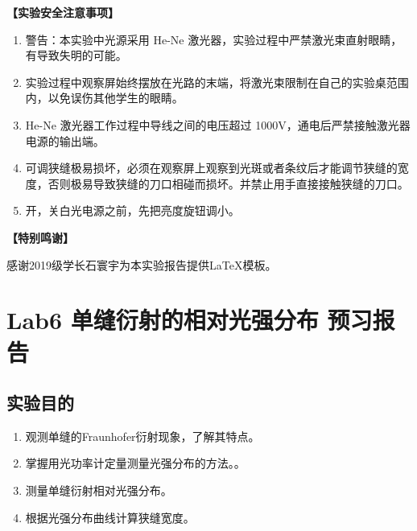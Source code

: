 \documentclass[dvipsnames, svgnames,a4paper,11pt]{article}
\begin{document}
	\textbf{【实验安全注意事项】}	
	\begin{enumerate}
		\item 警告：本实验中光源采用 He-Ne 激光器，实验过程中严禁激光束直射眼睛，有导致失明的可能。
		\item 实验过程中观察屏始终摆放在光路的末端，将激光束限制在自己的实验桌范围内，以免误伤其他学生的眼睛。
		\item He-Ne 激光器工作过程中导线之间的电压超过 1000V，通电后严禁接触激光器电源的输出端。
		\item 可调狭缝极易损坏，必须在观察屏上观察到光斑或者条纹后才能调节狭缝的宽度，否则极易导致狭缝的刀口相碰而损坏。并禁止用手直接接触狭缝的刀口。
		\item 开，关白光电源之前，先把亮度旋钮调小。
	\end{enumerate}
	
	\textbf{【特别鸣谢】}	
	
	感谢2019级学长石寰宇为本实验报告提供\LaTeX 模板。
	
	
	
	\clearpage
	\tableofcontents
	\clearpage
	
	
	
	\setcounter{section}{0}
	\section{Lab6 单缝衍射的相对光强分布 \quad\heiti 预习报告}
	
	\subsection{实验目的}
	\begin{enumerate}
		\item 观测单缝的Fraunhofer衍射现象，了解其特点。
		\item 掌握用光功率计定量测量光强分布的方法。。
		\item 测量单缝衍射相对光强分布。
		\item 根据光强分布曲线计算狭缝宽度。
	\end{enumerate}
	
\end{document}

